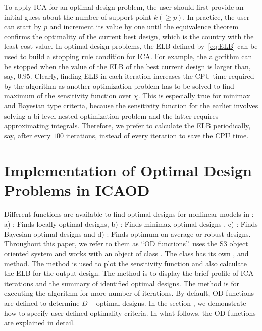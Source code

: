 To apply ICA for an optimal design problem, the user should first provide an initial guess about the number of support point $k (\geq p)$.
In practice, the user can start by $p$ and  increment its value by one  until  the equivalence theorem confirms the optimality of the current best  design, which is the country with the least cost value.
In optimal design problems, the ELB defined by~\eqref{eq:ELB} can  be used to build a stopping rule condition for ICA. For example, the algorithm can be stopped  when the value of the  ELB of the best current design is larger than, say,  $0.95$. Clearly, finding ELB in each iteration increases the CPU time required by the algorithm  as another  optimization problem has to be solved to find maximum of the sensitivity function over $\chi$. This is especially true for minimax and Bayesian type criteria, because  the sensitivity function for the earlier involves solving a bi-level nested optimization problem  and the latter requires approximating  integrals. Therefore, we prefer to calculate  the ELB  periodically, say, after every $100$  iterations, instead of every iteration to save the CPU time.


\section{Implementation of Optimal Design Problems in  ICAOD}
\label{sec:ICAOD-implementation}
Different functions are available to find optimal designs for nonlinear models in : a) : Finds  locally optimal designs,  b) : Finds minimax optimal designs , c) : Finds Bayesian optimal designs and d) : Finds optimum-on-average or robust designs.
Throughout this paper, we refer to them as ``OD  functions''.
 uses the S3 object oriented  system and  works with  an object of class .  The class  has its own ,   and  method. The  method is used to plot the sensitivity function and also calculate the ELB for the output design. The  method is to display the brief profile of ICA iterations and the summary of identified optimal designs. The  method is for executing  the algorithm for more number of iterations.
By default, OD functions are defined to determine $D-$optimal designs. In  the section , %
we demonstrate how  to specify user-defined optimality criteria.
In what follows, the OD functions are explained in detail.


